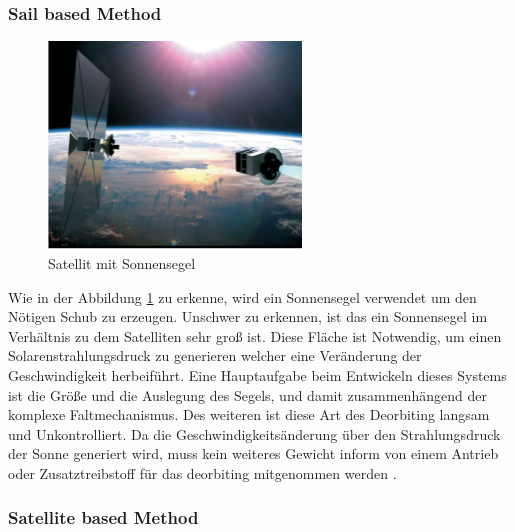 \subsubsection{Sail based Method}

	\begin{figure}[h]
			\centering
					\includegraphics[width=0.60\textwidth]{./graphics/ADR/Sonnensegel.PNG}
				\caption{Satellit mit Sonnensegel \cite{Romagnoli.2012}}
				\label{fig:Segel}
			\end{figure}

	
Wie in der Abbildung \ref{fig:Segel} zu erkenne, wird ein Sonnensegel verwendet um den Nötigen Schub zu erzeugen. Unschwer zu erkennen, ist das ein Sonnensegel im Verhältnis zu dem Satelliten sehr groß ist. Diese Fläche ist Notwendig, um einen Solarenstrahlungsdruck zu generieren welcher eine Veränderung der Geschwindigkeit herbeiführt. Eine Hauptaufgabe beim Entwickeln dieses Systems ist die Größe und die Auslegung des Segels, und damit zusammenhängend der komplexe Faltmechanismus. Des weiteren ist diese Art des Deorbiting langsam und Unkontrolliert. Da die Geschwindigkeitsänderung über den Strahlungsdruck der Sonne generiert wird, muss kein weiteres Gewicht inform von einem Antrieb oder Zusatztreibstoff für das deorbiting mitgenommen werden \cite{Romagnoli.2012,Mark.2019}.

\subsubsection{Satellite based Method}
	
